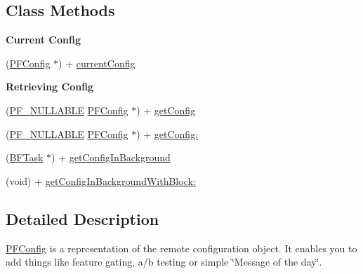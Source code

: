 \subsection*{Class Methods}
\begin{Indent}{\bf Current Config}\par
{\em 

 

 }\begin{DoxyCompactItemize}
\item 
(\hyperlink{interface_p_f_config}{P\+F\+Config} $\ast$) + \hyperlink{interface_p_f_config_ab9e3da933693acf660de9b8a47ad2458}{current\+Config}
\end{DoxyCompactItemize}
\end{Indent}
\begin{Indent}{\bf Retrieving Config}\par
{\em 

 

 }\begin{DoxyCompactItemize}
\item 
(\hyperlink{_p_f_nullability_8h_a528d97a96c5fb279a45c378f5657fca2}{P\+F\+\_\+\+N\+U\+L\+L\+A\+B\+L\+E} \hyperlink{interface_p_f_config}{P\+F\+Config} $\ast$) + \hyperlink{interface_p_f_config_a37fec05287d697bde8b5a16904acd584}{get\+Config}
\item 
(\hyperlink{_p_f_nullability_8h_a528d97a96c5fb279a45c378f5657fca2}{P\+F\+\_\+\+N\+U\+L\+L\+A\+B\+L\+E} \hyperlink{interface_p_f_config}{P\+F\+Config} $\ast$) + \hyperlink{interface_p_f_config_a81e06865d0ab836bd31f7d3328fb7fd5}{get\+Config\+:}
\item 
(\hyperlink{interface_b_f_task}{B\+F\+Task} $\ast$) + \hyperlink{interface_p_f_config_a2a2335783eb85531a9394bd61179fe04}{get\+Config\+In\+Background}
\item 
(void) + \hyperlink{interface_p_f_config_ab5e5b28884abba0e74d6398ae4ae8454}{get\+Config\+In\+Background\+With\+Block\+:}
\end{DoxyCompactItemize}
\end{Indent}


\subsection{Detailed Description}
{\ttfamily \hyperlink{interface_p_f_config}{P\+F\+Config}} is a representation of the remote configuration object. It enables you to add things like feature gating, a/b testing or simple \char`\"{}\+Message of the day\char`\"{}. 

